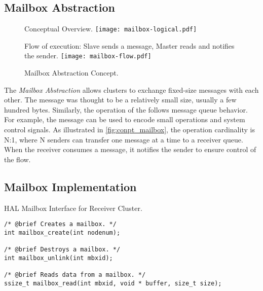 		\subsection{Mailbox Abstraction}
		\label{sec.mailbox-abs}

			\begin{figure}[!tb]
				\centering%
				\caption{Mailbox Abstraction Concept.}%
				\label{fig:conpt_mailbox}%

					{Conceptual Overview.}%
					{\texttt{[image: mailbox-logical.pdf]}}%

				\hfill

					{Flow of execution: Slave sends a message, Master reads and notifies the sender.}%
					{\texttt{[image: mailbox-flow.pdf]}}%

			\end{figure}


			The \textit{Mailbox Abstraction} allows clusters to exchange fixed-size
			messages with each other.
			The message was thought to be a relatively small size, usually a few hundred bytes.
			Similarly, the operation of the \mailbox follows \posix message queue behavior.
			For example, the message can be used to encode small operations and system
			control signals.
			As illustrated in \autoref{fig:conpt_mailbox}, the operation cardinality is N:1,
			where N senders can transfer one message at a time to a receiver queue.
			When the receiver consumes a message, it notifies the sender to ensure
			control of the flow.

			\subsection*{Mailbox Implementation}

\begin{listing}[!tb]
\caption{HAL Mailbox Interface for Receiver Cluster.}
\label{code:mailbox-receiver}
\begin{verbatim}
/* @brief Creates a mailbox. */
int mailbox_create(int nodenum);

/* @brief Destroys a mailbox. */
int mailbox_unlink(int mbxid);

/* @brief Reads data from a mailbox. */
ssize_t mailbox_read(int mbxid, void * buffer, size_t size);
\end{verbatim}
\end{listing}

